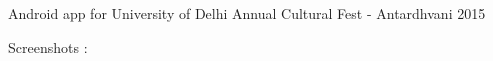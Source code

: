 Android app for University of Delhi Annual Cultural Fest -\/ Antardhvani 2015

Screenshots \+:

     